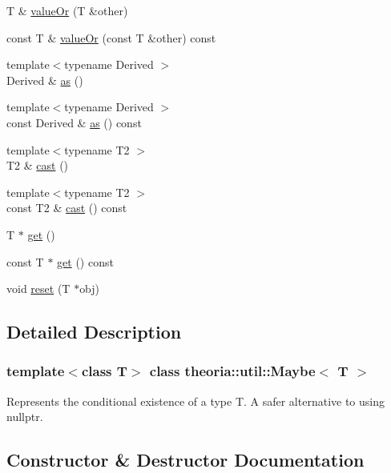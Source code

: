 \begin{DoxyCompactItemize}
\item 
T \& \hyperlink{classtheoria_1_1util_1_1Maybe_a0277381962cd4f2dc1d92f75a4cd964c}{value\+Or} (T \&other)
\item 
const T \& \hyperlink{classtheoria_1_1util_1_1Maybe_aabda3ca7f3ffd841653ae0f9dff29c8e}{value\+Or} (const T \&other) const
\item 
{\footnotesize template$<$typename Derived $>$ }\\Derived \& \hyperlink{classtheoria_1_1util_1_1Maybe_adfa406b81887a9dd40683e1c690d7367}{as} ()
\item 
{\footnotesize template$<$typename Derived $>$ }\\const Derived \& \hyperlink{classtheoria_1_1util_1_1Maybe_a5a30bc268a9bdb9f7a174d36d13754df}{as} () const
\item 
{\footnotesize template$<$typename T2 $>$ }\\T2 \& \hyperlink{classtheoria_1_1util_1_1Maybe_ae0db05f1fe430871069bd08d53bf4928}{cast} ()
\item 
{\footnotesize template$<$typename T2 $>$ }\\const T2 \& \hyperlink{classtheoria_1_1util_1_1Maybe_ace81aebc19ece88322c2d0966536ed3c}{cast} () const
\item 
T $\ast$ \hyperlink{classtheoria_1_1util_1_1Maybe_aeee7f778958a3c253f7ba57d190e55fe}{get} ()
\item 
const T $\ast$ \hyperlink{classtheoria_1_1util_1_1Maybe_aee0adf6d385b3120f9d91267c2ddf513}{get} () const
\item 
void \hyperlink{classtheoria_1_1util_1_1Maybe_a2e841f2d88d2fefa3d9936a1edadfae4}{reset} (T $\ast$obj)
\end{DoxyCompactItemize}


\subsection{Detailed Description}
\subsubsection*{template$<$class T$>$\newline
class theoria\+::util\+::\+Maybe$<$ T $>$}

Represents the conditional existence of a type T. A safer alternative to using nullptr. 

\subsection{Constructor \& Destructor Documentation}
\mbox{\label{classtheoria_1_1util_1_1Maybe_aff51836d12cb53b458316be21391e847}} 
